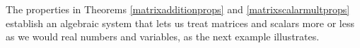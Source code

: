 %
%
%
The properties in Theorems \ref{matrixadditionprops} and \ref{matrixscalarmultprops} establish an algebraic system that lets us treat matrices and scalars more or less as we would real numbers and variables, as the next example illustrates.



